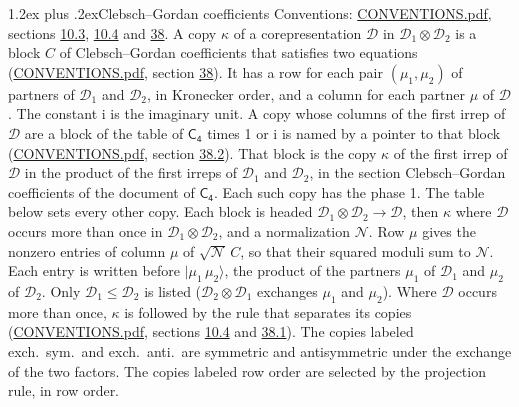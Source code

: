 \documentclass[10pt,a4paper]{article}
\makeatletter
\renewcommand\section{\@startsection{section}{1}{\z@}{-3ex plus -1ex minus -.2ex}%
  {1.2ex plus .2ex}{\normalfont\large\sffamily\bfseries\color{parttitle}}}
\numberwithin{equation}{section}
\newcommand{\grp}[1]{\mathsf{#1}}
\newcommand{\iunit}{\mathrm{i}}
\newcommand{\irrprod}{\otimes}
\newcommand{\mult}{\kappa}
\newcommand{\intx}{\mu}
\newcommand{\cgnorm}{\mathcal{N}}
\newcommand{\prodket}[2]{\lvert {#1}\,{#2}\rangle}
\makeatother
\begin{document}
\section{Clebsch--Gordan coefficients}\label{s:clebsch_gordan}
Conventions: \href{../../CONVENTIONS.pdf}{CONVENTIONS.pdf}, sections \href{../../../rotation/CONVENTIONS.pdf\#conv.10.3}{10.3}, \href{../../../rotation/CONVENTIONS.pdf\#conv.10.4}{10.4} and \href{../../CONVENTIONS.pdf\#conv.38}{38}.
\leavevmode\label{n:index.copy}\label{n:matrix.cg.stored}A copy $\mult$ of a corepresentation $\mathcal{D}$ in $\mathcal{D}_1\irrprod\mathcal{D}_2$ is a block $C$ of Clebsch--Gordan coefficients that satisfies two equations (\href{../../CONVENTIONS.pdf}{CONVENTIONS.pdf}, section \href{../../CONVENTIONS.pdf\#conv.38}{38}). \label{n:index.cg}It has a row for each pair $(\intx_1, \intx_2)$ of partners of $\mathcal{D}_1$ and $\mathcal{D}_2$, in Kronecker order, and a column for each partner $\intx$ of $\mathcal{D}$.
The constant $\iunit$ is the imaginary unit.
A copy whose columns of the first irrep of $\mathcal{D}$ are a block of the table of $\grp{C_{4}}$ times 1 or $\iunit$ is named by a pointer to that block (\href{../../CONVENTIONS.pdf}{CONVENTIONS.pdf}, section \href{../../CONVENTIONS.pdf\#conv.38.2}{38.2}). That block is the copy $\mult$ of the first irrep of $\mathcal{D}$ in the product of the first irreps of $\mathcal{D}_1$ and $\mathcal{D}_2$, in the section Clebsch--Gordan coefficients of the document of \href{../../../rotation/data/pdf/C4.pdf}{$\grp{C_{4}}$}. Each such copy has the phase 1. The table below sets every other copy.
Each block is headed $\mathcal{D}_1\irrprod\mathcal{D}_2\to\mathcal{D}$, then $\mult$ where $\mathcal{D}$ occurs more than once in $\mathcal{D}_1\irrprod\mathcal{D}_2$, and a normalization $\cgnorm$. Row $\intx$ gives the nonzero entries of column $\intx$ of $\sqrt{\cgnorm}\,C$, so that their squared moduli sum to $\cgnorm$. \label{n:vector.ket.product}Each entry is written before $\prodket{\intx_1}{\intx_2}$, the product of the partners $\intx_1$ of $\mathcal{D}_1$ and $\intx_2$ of $\mathcal{D}_2$. Only $\mathcal{D}_1 \le \mathcal{D}_2$ is listed ($\mathcal{D}_2\irrprod\mathcal{D}_1$ exchanges $\intx_1$ and $\intx_2$).
Where $\mathcal{D}$ occurs more than once, $\mult$ is followed by the rule that separates its copies (\href{../../CONVENTIONS.pdf}{CONVENTIONS.pdf}, sections \href{../../../rotation/CONVENTIONS.pdf\#conv.10.4}{10.4} and \href{../../CONVENTIONS.pdf\#conv.38.1}{38.1}). \label{n:abbreviation.exchange}The copies labeled exch.\ sym.\ and exch.\ anti.\ are symmetric and antisymmetric under the exchange of the two factors. The copies labeled row order are selected by the projection rule, in row order.
\end{document}
